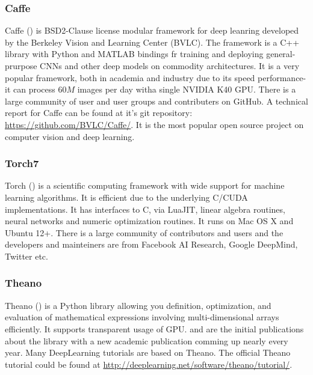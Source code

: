 \subsubsection{Caffe}
Caffe (\cite{caffe_soft}) is BSD2-Clause license modular framework for deep leanring developed by the Berkeley Vision and Learning Center (BVLC). The framework is a C++ library with Python and MATLAB bindings fr training and deploying general-prurpose CNNs and other deep models on commodity architectures. It is a very popular framework, both in academia and industry due to its speed performance- it can process $60M$ images per day witha single NVIDIA K40 GPU. There is a large community of user and user groups and contributers on GitHub. A technical report for Caffe can be found at it's git repository: \url{https://github.com/BVLC/Caffe/}. It is the most popular open source project on computer vision and deep learning.  
\subsubsection{Torch7}
Torch (\cite{torch_soft}) is a scientific computing framework with wide support for machine learning algorithms. It is efficient due to the underlying C/CUDA implementations. It has interfaces to C, via LuaJIT, linear algebra routines, neural networks and numeric optimization routines. It runs on Mac OS X and Ubuntu 12+. There is a large community of contributors and users and the developers and mainteiners are from Facebook AI Research, Google DeepMind, Twitter etc. 
\subsubsection{Theano}
Theano (\cite{theano_soft}) is a Python library allowing you definition, optimization, and evaluation of mathematical expressions involving multi-dimensional arrays efficiently. It supports transparent usage of GPU. \cite{bergstra+al:2010-scipy} and \cite{Bastien-Theano-2012} are the initial publications about the library with a new academic publication comming up nearly every year. Many DeepLearning tutorials are based on Theano. The official Theano tutorial could be found at \url{http://deeplearning.net/software/theano/tutorial/}.
